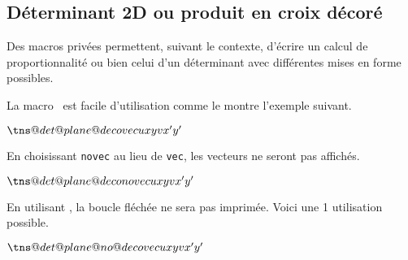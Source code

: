 \documentclass[12pt,a4paper]{article}
\begin{document}

\subsection{Déterminant 2D ou produit en croix décoré}

Des macros privées permettent, suivant le contexte, d'écrire un calcul de proportionnalité ou bien celui d'un déterminant avec différentes mises en forme possibles.





La macro  est facile d'utilisation comme le montre l'exemple suivant.

\begin{latexex}
\makeatletter
$\tns@det@plane@deco%
     {vec}     %
     {u}       %
     {x}{y}    %
     {v}       %
     {x'}{y'}$ %
\makeatother
\end{latexex}





En choisissant \verb+novec+ au lieu de \verb+vec+, les vecteurs ne seront pas affichés.

\begin{latexex}
\makeatletter
$\tns@det@plane@deco{novec}   %
                    {u}{x}{y} %
                    {v}{x'}{y'}$
\makeatother
\end{latexex}





En utilisant , la boucle fléchée ne sera pas imprimée. Voici une 1\iere{} utilisation possible.

\begin{latexex}
\makeatletter
$\tns@det@plane@no@deco{vec}     %
                       {u}{x}{y} %
                       {v}{x'}{y'}$
\makeatother
\end{latexex}




\end{document}
